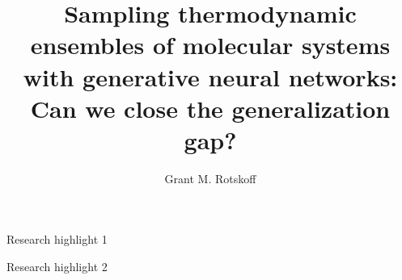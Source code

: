 \documentclass[final,3p,times,twocolumn]{elsarticle}
\begin{document}
\begin{frontmatter}



\title{Sampling thermodynamic ensembles of molecular systems with generative neural networks: Can we close the generalization gap?}

\author[label1,label2]{Grant M. Rotskoff}


\begin{abstract}

\end{abstract}

\begin{graphicalabstract}
\end{graphicalabstract}

\begin{highlights}
\item Research highlight 1
\item Research highlight 2
\end{highlights}


\end{frontmatter}
\end{document}
